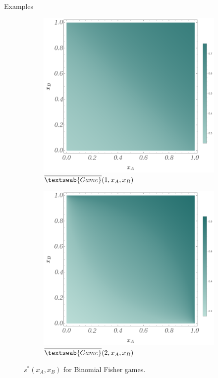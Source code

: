 \documentclass{beamer}
\theoremstyle{definition}
\newcommand{\InfG}[1]{$\overline{\textswab{Game}}(#1)$}
\begin{document}
\begin{frame}{Examples}

    \begin{figure}[H]
    \centering
    \begin{subfigure}[b]{0.4\textwidth}
        \includegraphics[width=\textwidth]{img/BinomialFisher_s_1.png}
        \caption{\small \centering \InfG{1,x_A,x_B}}
        \label{fig:sG_1}
    \end{subfigure}
    \hspace{0.05\textwidth} %
    \begin{subfigure}[b]{0.4\textwidth}
        \includegraphics[width=\textwidth]{img/BinomialFisher_s_2.png}
        \caption{\small \centering \InfG{2,x_A,x_B}}
        \label{fig:sG_2}
    \end{subfigure}
    
    \caption{\small \centering $s^*(x_A,x_B)$ for Binomial Fisher games.}
    \label{fig:s_InfG_1_2}
\end{figure}
\end{frame}
\end{document}

